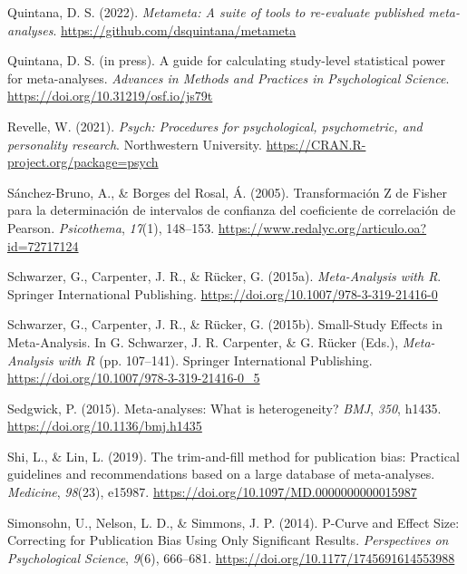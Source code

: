 \documentclass[
  bookmarksnumbered]{article}
\newlength{\cslhangindent}
\newlength{\cslentryspacingunit} %
\newenvironment{CSLReferences}[2] %
 {%
  \setlength{\parindent}{0pt}
  \ifodd #1
  \let\oldpar\par
  \def\par{\hangindent=\cslhangindent\oldpar}
  \fi
  \setlength{\parskip}{#2\cslentryspacingunit}
 }%
 {}
\begin{document}
\begin{CSLReferences}{1}{0}
\leavevmode{}%
Quintana, D. S. (2022). \emph{Metameta: A suite of tools to re-evaluate published meta-analyses}. \url{https://github.com/dsquintana/metameta}

\leavevmode{}%
Quintana, D. S. (in press). A guide for calculating study-level statistical power for meta-analyses. \emph{{Advances in Methods and Practices in Psychological Science}}. \url{https://doi.org/10.31219/osf.io/js79t}

\leavevmode{}%
Revelle, W. (2021). \emph{Psych: Procedures for psychological, psychometric, and personality research}. Northwestern University. \url{https://CRAN.R-project.org/package=psych}

\leavevmode{}%
Sánchez-Bruno, A., \& Borges del Rosal, Á. (2005). {Transformación Z de Fisher para la determinación de intervalos de confianza del coeficiente de correlación de Pearson}. \emph{Psicothema}, \emph{17}(1), 148--153. \url{https://www.redalyc.org/articulo.oa?id=72717124}

\leavevmode{}%
Schwarzer, G., Carpenter, J. R., \& Rücker, G. (2015a). \emph{Meta-{Analysis} with {R}}. {Springer International Publishing}. \url{https://doi.org/10.1007/978-3-319-21416-0}

\leavevmode{}%
Schwarzer, G., Carpenter, J. R., \& Rücker, G. (2015b). Small-{Study Effects} in {Meta}-{Analysis}. In G. Schwarzer, J. R. Carpenter, \& G. Rücker (Eds.), \emph{Meta-{Analysis} with {R}} (pp. 107--141). {Springer International Publishing}. \url{https://doi.org/10.1007/978-3-319-21416-0_5}

\leavevmode{}%
Sedgwick, P. (2015). Meta-analyses: What is heterogeneity? \emph{BMJ}, \emph{350}, h1435. \url{https://doi.org/10.1136/bmj.h1435}

\leavevmode{}%
Shi, L., \& Lin, L. (2019). The trim-and-fill method for publication bias: Practical guidelines and recommendations based on a large database of meta-analyses. \emph{Medicine}, \emph{98}(23), e15987. \url{https://doi.org/10.1097/MD.0000000000015987}

\leavevmode{}%
Simonsohn, U., Nelson, L. D., \& Simmons, J. P. (2014). P-{Curve} and {Effect Size}: {Correcting} for {Publication Bias Using Only Significant Results}. \emph{Perspectives on Psychological Science}, \emph{9}(6), 666--681. \url{https://doi.org/10.1177/1745691614553988}


\end{CSLReferences}
\end{document}
